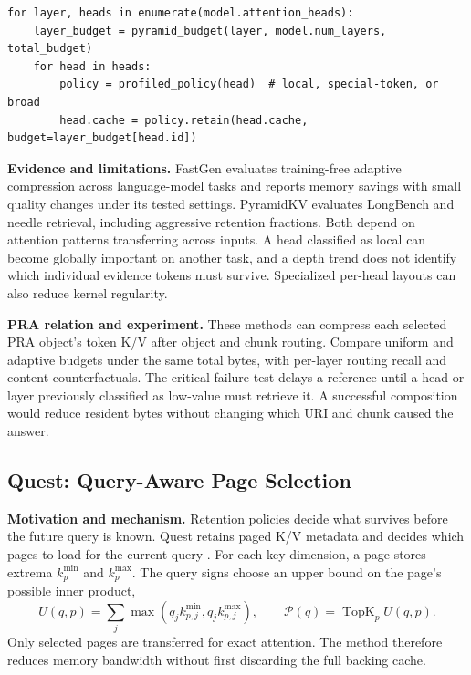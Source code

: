 \begin{lstlisting}[caption={Composing head policy with a layer-dependent cache budget}]
for layer, heads in enumerate(model.attention_heads):
    layer_budget = pyramid_budget(layer, model.num_layers, total_budget)
    for head in heads:
        policy = profiled_policy(head)  # local, special-token, or broad
        head.cache = policy.retain(head.cache, budget=layer_budget[head.id])
\end{lstlisting}

\textbf{Evidence and limitations.} FastGen evaluates training-free adaptive compression
across language-model tasks and reports memory savings with small quality changes under its
tested settings. PyramidKV evaluates LongBench and needle retrieval, including aggressive
retention fractions. Both depend on attention patterns transferring across inputs. A head
classified as local can become globally important on another task, and a depth trend does
not identify which individual evidence tokens must survive. Specialized per-head layouts
can also reduce kernel regularity.

\textbf{PRA relation and experiment.} These methods can compress each selected PRA object's
token K/V after object and chunk routing. Compare uniform and adaptive budgets under the
same total bytes, with per-layer routing recall and content counterfactuals. The critical
failure test delays a reference until a head or layer previously classified as low-value
must retrieve it. A successful composition would reduce resident bytes without changing
which URI and chunk caused the answer.

\subsection{Quest: Query-Aware Page Selection}

\textbf{Motivation and mechanism.} Retention policies decide what survives before the
future query is known. Quest retains paged K/V metadata and decides which pages to load for
the current query \citep{tang2024quest}. For each key dimension, a page stores extrema
$k^{\min}_p$ and $k^{\max}_p$. The query signs choose an upper bound on the page's possible
inner product,
\begin{equation}
U(q,p)=\sum_j \max(q_j k^{\min}_{p,j},q_j k^{\max}_{p,j}),
\qquad \mathcal P(q)=\operatorname{TopK}_p U(q,p).
\end{equation}
Only selected pages are transferred for exact attention. The method therefore reduces
memory bandwidth without first discarding the full backing cache.

